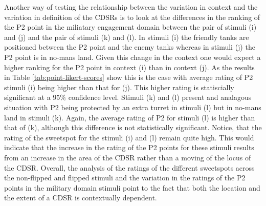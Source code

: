\documentclass[11pt,letterpaper]{article}
\begin{document}
Another way of testing the relationship between the variation in context and the variation in definition of the CDSRs is to look at the differences in the ranking of the P2 point in the miliatary engagement domain between the pair of stimuli (i) and (j) and the pair of stimuli (k) and (l). In stimuli (i) the friendly tanks are positioned between the P2 point and the enemy tanks whereas in stimuli (j) the P2 point is in no-mans land. Given this change in the context one would expect a higher ranking for the P2 point in context (i) than in context (j). As the results in Table \ref{tab:point-likert-scores} show this is the case with average rating of P2  stimuli (i) being higher than that for (j). This higher rating is statiscially significant at a $95\%$ confidence level. Stimuli (k) and (l) present and analagous situation with P2 being protected by an extra turret in stimuli (l) but in no-mans land in stimuli (k). Again, the average rating of P2 for stimuli (l) is higher than that of (k), although this difference is not statistically significant. Notice, that the rating of the sweetspot for the stimuli (i) and (l) remain quite high. This would indicate that the increase in the rating of the P2 points for these stimuli results from an increase in the area of the CDSR rather than a moving of the locus of the CDSR. Overall, the analysis of the ratings of the different sweetspots across the non-flipped and flipped stimuli and the variation in the ratings of the P2 points in the military domain stimuli point to the fact that both the location and the extent of a CDSR is contextually dependent.


\end{document}
